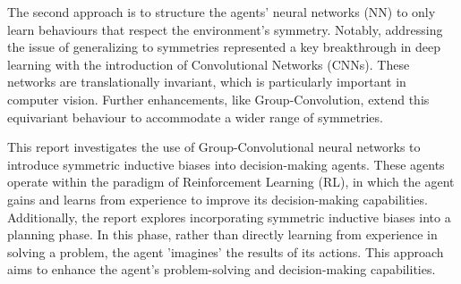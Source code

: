 The second approach is to structure the agents' neural networks (NN) to only learn behaviours that respect the environment's symmetry\cite{vanderpol2020mdp,wang2022so2, mondal2020group}. Notably, addressing the issue of generalizing to symmetries represented a key breakthrough in deep learning with the introduction of Convolutional Networks (CNNs)\cite{lecun1989backprop}. These networks are translationally invariant, which is particularly important in computer vision. Further enhancements, like Group-Convolution\cite{cohen2016group}, extend this equivariant behaviour to accommodate a wider range of symmetries.

This report investigates the use of Group-Convolutional neural networks to introduce symmetric inductive biases into decision-making agents. These agents operate within the paradigm of Reinforcement Learning (RL), in which the agent gains and learns from experience to improve its decision-making capabilities. Additionally, the report explores incorporating symmetric inductive biases into a planning phase. In this phase, rather than directly learning from experience in solving a problem, the agent 'imagines' the results of its actions. This approach aims to enhance the agent's problem-solving and decision-making capabilities.
